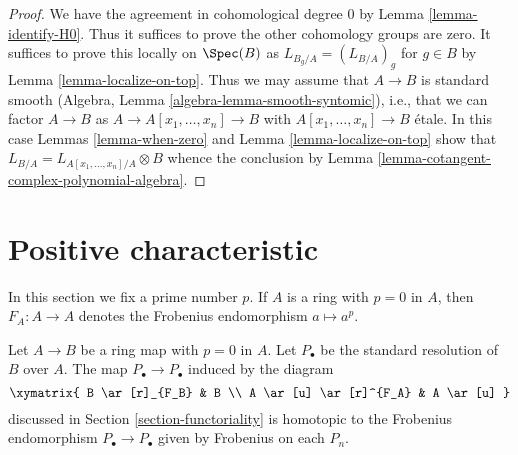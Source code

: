 \begin{proof}
We have the agreement in cohomological degree $0$ by
Lemma \ref{lemma-identify-H0}.
Thus it suffices to prove the other cohomology groups
are zero. It suffices to prove this locally on $\Spec(B)$ as
$L_{B_g/A} = (L_{B/A})_g$ for $g \in B$ by Lemma \ref{lemma-localize-on-top}.
Thus we may assume that $A \to B$ is standard smooth
(Algebra, Lemma \ref{algebra-lemma-smooth-syntomic}), i.e.,
that we can factor $A \to B$ as
$A \to A[x_1, \ldots, x_n] \to B$ with $A[x_1, \ldots, x_n] \to B$
\'etale. In this case Lemmas \ref{lemma-when-zero} and
Lemma \ref{lemma-localize-on-top} show that
$L_{B/A} = L_{A[x_1, \ldots, x_n]/A} \otimes B$
whence the conclusion by
Lemma \ref{lemma-cotangent-complex-polynomial-algebra}.
\end{proof}





\section{Positive characteristic}
\label{section-positive-characteristic}

\noindent
In this section we fix a prime number $p$.
If $A$ is a ring with $p = 0$ in $A$, then $F_A : A \to A$
denotes the Frobenius endomorphism $a \mapsto a^p$.

\begin{lemma}
\label{lemma-frobenius-homotopy}
Let $A \to B$ be a ring map with $p = 0$ in $A$. Let $P_\bullet$ be the
standard resolution of $B$ over $A$. The map $P_\bullet \to P_\bullet$
induced by the diagram
$$
\xymatrix{
B \ar[r]_{F_B} & B \\
A \ar[u] \ar[r]^{F_A} & A \ar[u]
}
$$
discussed in Section \ref{section-functoriality} is homotopic to the Frobenius
endomorphism $P_\bullet \to P_\bullet$ given by Frobenius on each $P_n$.
\end{lemma}

